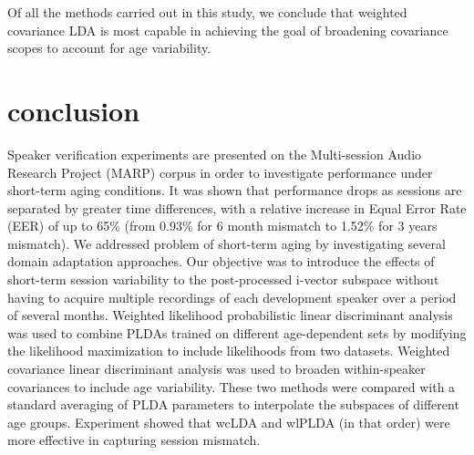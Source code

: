 \documentclass[a4paper]{article}
\begin{document}
Of all the methods carried out in this study, we conclude that weighted covariance LDA is most capable in achieving the goal of broadening covariance scopes to account for age variability.  

\section{conclusion}
Speaker verification experiments are presented on the Multi-session Audio Research Project (MARP) corpus in order to investigate performance under short-term aging conditions. It was shown that performance drops as sessions are separated by greater time differences, with a relative increase in Equal Error Rate (EER) of up to 65\% (from 0.93\% for 6 month mismatch to 1.52\% for 3 years mismatch). We addressed problem of short-term aging by investigating several domain adaptation approaches. Our objective was to introduce the effects of short-term session variability to the post-processed i-vector subspace without having to acquire multiple recordings of each development speaker over a period of several months. Weighted likelihood probabilistic linear discriminant analysis was used to combine PLDAs trained on different age-dependent sets by modifying the likelihood maximization to include likelihoods from two datasets. Weighted covariance linear discriminant analysis was used to broaden within-speaker covariances to include age variability. These two methods were compared with a standard averaging of PLDA parameters to interpolate the subspaces of different age groups. Experiment showed that wcLDA and wlPLDA (in that order) were more effective in capturing session mismatch.  

  \newpage
  \eightpt
  

  
\end{document}
